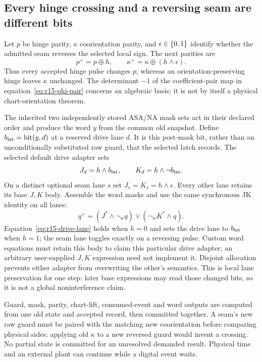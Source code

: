 \subsection{Every hinge crossing and a reversing seam are different bits}
Let $p$ be hinge parity, $\kappa$ coorientation parity, and
$\epsilon\in\{0,1\}$ identify whether the admitted seam reverses the selected
local sign. The next parities are
\begin{equation}
 p^+=p\oplus h,\qquad
 \kappa^+=\kappa\oplus(h\land\epsilon).
 \label{eq:r15-two-parities}
\end{equation}
Thus every accepted hinge pulse changes $p$, whereas an orientation-preserving
hinge leaves $\kappa$ unchanged. The determinant $-1$ of the coefficient-pair
map in equation~\eqref{eq:r15-phi-pair} concerns an algebraic basis; it is not
by itself a physical chart-orientation theorem.

The inherited two independently stored ASA/NA mask sets act in their declared
order and produce the word $y$ from the common old snapshot. Define
$b_{\rm lat}=\operatorname{bit}(y,d)$ at a reserved drive lane $d$.
It is this post-mask bit, rather than an unconditionally substituted raw
guard, that the selected latch records. The selected default drive adapter
sets
\begin{equation}
 J_d=h\land b_{\rm lat},\qquad K_d=h\land\neg b_{\rm lat}.
 \label{eq:r15-drive-lane}
\end{equation}
On a distinct optional seam lane $s$ set $J_s=K_s=h\land\epsilon$.
Every other lane retains its base $J,K$ body. Assemble the word masks and use
the same synchronous JK identity on all lanes:
\begin{equation}
 q^+=(J^*\land\neg_w q)\lor(\neg_w K^*\land q).
 \label{eq:r15-jk}
\end{equation}
Equation~\eqref{eq:r15-drive-lane} holds when $h=0$ and sets the drive lane to
$b_{\rm lat}$ when $h=1$; the seam lane toggles exactly on a reversing pulse.
Custom word equations must retain this body to claim this particular drive
adapter; an arbitrary user-supplied $J,K$ expression need not implement it.
Disjoint allocation prevents either adapter from overwriting the other's
semantics. This is local lane preservation for one step: later base expressions
may read those changed bits, so it is not a global noninterference claim.

Guard, mask, parity, chart-lift, consumed-event and word outputs are computed
from one old state and accepted record, then committed together. A seam's new
raw guard must be paired with the matching new coorientation before comparing
physical sides; applying old $\kappa$ to a new reversed guard would invent a
crossing. No partial state is committed for an unresolved demanded result.
Physical time and an external plant can continue while a digital event waits.

